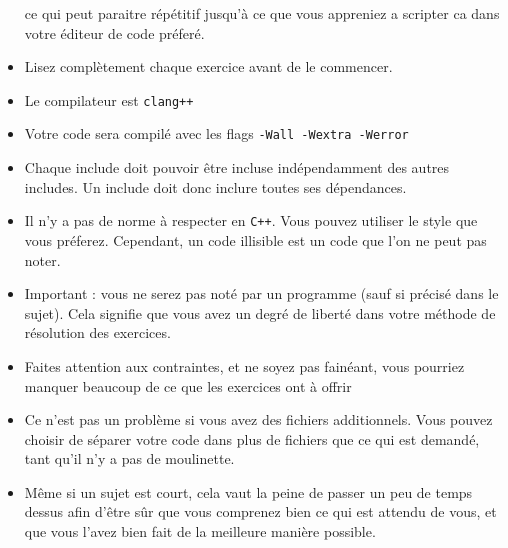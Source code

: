 \begin{itemize}
          ce qui peut paraitre répétitif jusqu'à ce que vous appreniez a scripter
          ca dans votre éditeur de code préferé.
        \item Lisez complètement chaque exercice avant de le commencer.
        \item Le compilateur est \texttt{clang++}
        \item Votre code sera compilé avec les flags \texttt{-Wall -Wextra -Werror}
        \item Chaque include doit pouvoir être incluse indépendamment des autres includes.
          Un include doit donc inclure toutes ses dépendances.
        \item Il n'y a pas de norme à respecter en \texttt{C++}. Vous pouvez utiliser 
          le style que vous préferez. Cependant, un code illisible est un code 
          que l'on ne peut pas noter.
        \item Important : vous ne serez pas noté par un programme (sauf si précisé
          dans le sujet). Cela signifie que vous avez un degré de liberté dans 
          votre méthode de résolution des exercices. 
        \item Faites attention aux contraintes, et ne soyez pas fainéant, vous pourriez
          manquer beaucoup de ce que les exercices ont à offrir
        \item Ce n'est pas un problème si vous avez des fichiers additionnels. Vous pouvez 
          choisir de séparer votre code dans plus de fichiers que ce qui est demandé, 
          tant qu'il n'y a pas de moulinette.
        \item Même si un sujet est court, cela vaut la peine de passer un peu de temps dessus
          afin d'être sûr que vous comprenez bien ce qui est attendu de vous, et que vous l'avez 
          bien fait de la meilleure manière possible.

\end{itemize}

\newpage
